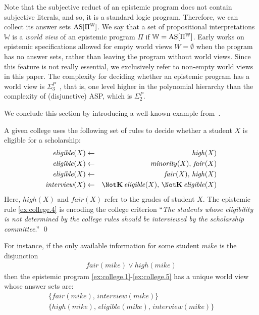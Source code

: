 \documentclass{new_tlp}
\def\K{\mathbf{K}\, }
\let\sneg\relax
\newcommand{\sneg}{\ensuremath{\text{-}}}
\def\AS{\text{\rm AS}}
\newcommand\wv{\mathbb{W}}
\def\eligible{\mathit{eligible}}
\def\minority{\mathit{minority}}
\def\high{\mathit{high}}
\def\fair{\mathit{fair}}
\def\interview{\mathit{interview}}
\begin{document}
Note that the subjective reduct of an epistemic program does not contain subjective literals, and so, it is a standard logic program.
%
Therefore, we can collect its answer sets $\AS[\Pi^\wv]$.
%
We say that a set of propositional interpretations $\wv$ is a \emph{world view} of an epistemic program $\Pi$ if $\wv=\AS[\Pi^\wv]$.
%
Early works on epistemic specifications allowed for empty world views $W=\emptyset$ when the program has no answer sets, rather than leaving the program without world views.
%
Since this feature is not really essential, we exclusively refer to non-empty world views in this paper.
%
The complexity for deciding whether an epistemic program has a world view is $\Sigma^{P}_{3}$~\cite{truszczynski11b}, that is,
one level higher in the polynomial hierarchy than the complexity of (disjunctive) ASP, which is $\Sigma^{P}_{2}$.

We conclude this section by introducing a well-known example from~\cite{gelfond91a}.

\begin{example}\label{ex:college}
A given college uses the following set of rules to decide whether a student $X$ is eligible for a scholarship:
\begin{eqnarray}
\eligible(X) & \leftarrow & \high(X)   \label{ex:college.1} \\
\eligible(X) & \leftarrow & \minority(X),\, \fair(X) \label{ex:college.2}\\
\sneg\eligible(X) & \leftarrow & \sneg\fair(X),\, \sneg\high(X) \label{ex:college.3}\\
\interview(X) &\leftarrow  &\Not \K \eligible(X),\,
\Not \K \sneg \eligible(X) \label{ex:college.4}
\end{eqnarray}
Here, $\high(X)$ and $\fair(X)$ refer to the grades of student $X$.
The epistemic rule \eqref{ex:college.4} is encoding the college criterion
``\emph{The students whose eligibility is not determined by the college rules should be interviewed by the scholarship committee}.''
\qed
\end{example}
For instance, if the only available information for some student $mike$ is the disjunction
\begin{gather}
\fair(mike) \vee \high(mike) \label{ex:college.5}
\end{gather}
then the epistemic program \eqref{ex:college.1}-\eqref{ex:college.5} has a unique world view whose answer sets are:
\begin{eqnarray}
&\{\fair(mike),\,\interview(mike)\}& \label{f:sm1}\\
&\{\high(mike),\,\eligible(mike),\,\interview(mike)\} &\label{f:sm2}
\end{eqnarray}
\end{document}
